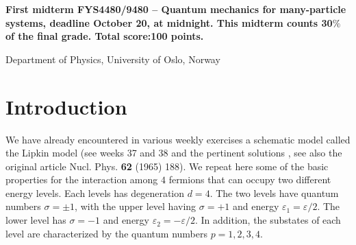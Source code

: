 \documentclass[prc]{revtex4} \usepackage[dvips]{graphicx}
\begin{document}
\begin{center}
{\LARGE\bf
First midterm FYS4480/9480 – Quantum mechanics for many-particle systems, deadline October 20, at midnight. This midterm counts 30$\%$ of the final grade. Total score:100 points.}
\end{center}
\begin{center}
\centerline{{\small Department of Physics, University of Oslo, Norway}}
\end{center}

\section*{Introduction}

We have already encountered in various weekly exercises a schematic model called the Lipkin model (see weeks 37 and 38 and the pertinent solutions , see also the original article Nucl.
Phys. {\bf 62} (1965) 188). We repeat here some of the basic properties for the interaction among  $4$
fermions that can occupy two different energy levels. Each levels has degeneration $d=4$. The two levels have quantum numbers $\sigma=\pm 1$,
with the upper level having  $\sigma=+1$ and energy
$\varepsilon_{1}=
\varepsilon/2$. The lower level  has $\sigma=-1$ and energy
$\varepsilon_{2}=-\varepsilon/2$. 
In addition, the substates  of each level are characterized  
by the quantum numbers $p=1,2,3,4$.
\end{document}
